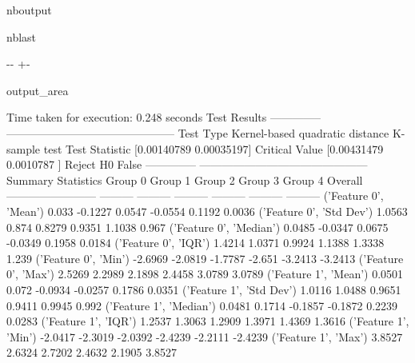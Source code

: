 \documentclass[letterpaper,10pt,english,openany,oneside]{sphinxmanual}
\begin{document}
\begin{sphinxuseclass}{nboutput}
\begin{sphinxuseclass}{nblast}
{

\kern-\sphinxverbatimsmallskipamount\kern-\baselineskip
\kern+\FrameHeightAdjust\kern-\fboxrule
\vspace{\nbsphinxcodecellspacing}

\begin{sphinxuseclass}{output_area}
\begin{sphinxuseclass}{}


\begin{sphinxVerbatim}[commandchars=\\\{\}]
Time taken for execution: 0.248 seconds
Test Results
--------------  ---------------------------------------------
Test Type       Kernel-based quadratic distance K-sample test
Test Statistic  [0.00140789 0.00035197]
Critical Value  [0.00431479 0.0010787 ]
Reject H0       False
--------------  ---------------------------------------------
Summary Statistics
                            Group 0    Group 1    Group 2    Group 3    Group 4    Overall
------------------------  ---------  ---------  ---------  ---------  ---------  ---------
('Feature 0', 'Mean')        0.033     -0.1227     0.0547    -0.0554     0.1192     0.0036
('Feature 0', 'Std Dev')     1.0563     0.874      0.8279     0.9351     1.1038     0.967
('Feature 0', 'Median')      0.0485    -0.0347     0.0675    -0.0349     0.1958     0.0184
('Feature 0', 'IQR')         1.4214     1.0371     0.9924     1.1388     1.3338     1.239
('Feature 0', 'Min')        -2.6969    -2.0819    -1.7787    -2.651     -3.2413    -3.2413
('Feature 0', 'Max')         2.5269     2.2989     2.1898     2.4458     3.0789     3.0789
('Feature 1', 'Mean')        0.0501     0.072     -0.0934    -0.0257     0.1786     0.0351
('Feature 1', 'Std Dev')     1.0116     1.0488     0.9651     0.9411     0.9945     0.992
('Feature 1', 'Median')      0.0481     0.1714    -0.1857    -0.1872     0.2239     0.0283
('Feature 1', 'IQR')         1.2537     1.3063     1.2909     1.3971     1.4369     1.3616
('Feature 1', 'Min')        -2.0417    -2.3019    -2.0392    -2.4239    -2.2111    -2.4239
('Feature 1', 'Max')         3.8527     2.6324     2.7202     2.4632     2.1905     3.8527
\end{sphinxVerbatim}



\end{sphinxuseclass}
\end{sphinxuseclass}
}

\end{sphinxuseclass}
\end{sphinxuseclass}
\end{document}
